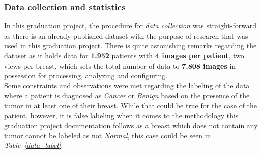 \documentclass[12pt]{extarticle}
\begin{document}
	\subsubsection{Data collection and statistics}\label{Data_collection}
	In this graduation project, the procedure for \emph{data collection} was straight-forward as there is an already published dataset \cite{Dataset} with the purpose of research that was used in this graduation project. There is quite astonishing remarks regarding the dataset as it holds data for \textbf{1.952} patients with \textbf{4 images per patient}, two views per breast, which sets the total number of data to \textbf{7.808 images} in possession for processing, analyzing and configuring.\\[5mm]
	Some constraints and observations were met regarding the labeling of the data where a patient is diagnosed as \emph{Cancer} or \emph{Benign} based on the presence of the tumor in at least one of their breast. While that could be true for the case of the patient, however, it is false labeling when it comes to the methodology this graduation project documentation follows as a breast which does not contain any tumor cannot be labeled as not \emph{Normal}, this case could be seen in \emph{Table~\ref{data_label}}.
\end{document}
